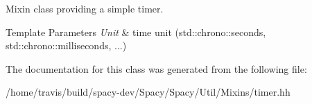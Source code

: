 Mixin class providing a simple timer. 


\begin{DoxyTemplParams}{Template Parameters}
{\em Unit} & time unit (std\-::chrono\-::seconds, std\-::chrono\-::milliseconds, ...) \\
\hline
\end{DoxyTemplParams}


The documentation for this class was generated from the following file\-:\begin{DoxyCompactItemize}
\item 
/home/travis/build/spacy-\/dev/\-Spacy/\-Spacy/\-Util/\-Mixins/timer.\-hh\end{DoxyCompactItemize}
